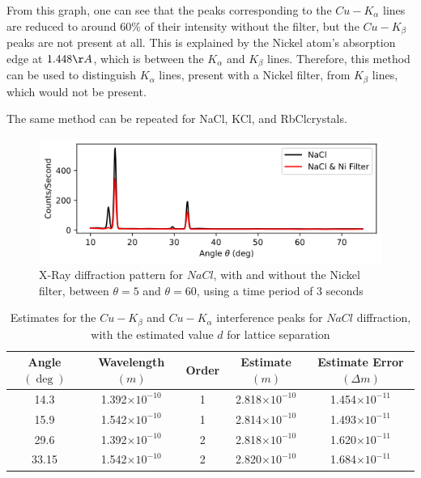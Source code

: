 \documentclass[a4paper]{article}
\begin{document}
From this graph, one can see that the peaks corresponding to the $Cu-K_\alpha$ lines are reduced to around 60\% of their intensity without the filter, but the $Cu-K_\beta$ peaks are not present at all. This is explained by the Nickel atom's absorption edge at $1.448\r A$, which is between the $K_\alpha$ and $K_\beta$ lines. Therefore, this method can be used to distinguish $K_\alpha$ lines, present with a Nickel filter, from $K_\beta$ lines, which would not be present.

The same method can be repeated for NaCl\footnotemark[1], KCl\footnotemark[2], and RbCl\footnotemark[2] crystals.


\begin{figure}[h!]
\centerline{\includegraphics[scale=0.8]{nacl.png}}
\caption{X-Ray diffraction pattern for $NaCl$, with and without the Nickel filter, between $\theta=5$ and $\theta=60$, using a time period of 3 seconds}
\label{fig:nacl}
\end{figure}

\begin{table}[h!]
\centering
\begin{tabular}{ccccc}
\hline
Angle $(\deg)$ & Wavelength $(m)$ & Order & Estimate $(m)$ & Estimate Error $(\Delta m)$\\ \hline
14.3 & 1.392$\times10^{-10}$ & 1 & 2.818$\times10^{-10}$ & 1.454$\times10^{-11}$ \\
15.9 & 1.542$\times10^{-10}$ & 1 & 2.814$\times10^{-10}$ & 1.493$\times10^{-11}$ \\
29.6 & 1.392$\times10^{-10}$ & 2 & 2.818$\times10^{-10}$ & 1.620$\times10^{-11}$ \\
33.15 & 1.542$\times10^{-10}$ & 2 & 2.820$\times10^{-10}$ & 1.684$\times10^{-11}$ \\
\end{tabular}
\caption{\label{tab:nacltab}Estimates for the $Cu-K_\beta$ and $Cu-K_\alpha$ interference peaks for $NaCl$ diffraction, with the estimated value $d$ for lattice separation}
\end{table}
\end{document}
